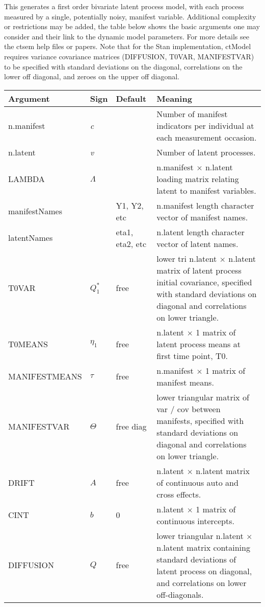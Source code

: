 \documentclass[nojss]{jss}\usepackage[]{graphicx}\usepackage[]{color}
\begin{document}
This generates a first order bivariate latent process model, with each process measured by a single, potentially noisy, manifest variable. Additional complexity or restrictions may be added, the table below shows the basic arguments one may consider and their link to the dynamic model parameters. For more details see the ctsem help files or papers. Note that for the Stan implementation, ctModel requires variance covariance matrices (DIFFUSION, T0VAR, MANIFESTVAR) to be specified with standard deviations on the diagonal, correlations on the lower off diagonal, and zeroes on the upper off diagonal. 

\begin{table}\footnotesize
\begin{tabular}{l|l|l p{8cm} }
\textbf{Argument} & \textbf{Sign} & \textbf{Default} & \textbf{Meaning}\\
\hline
 n.manifest & \textit{c} & & Number of manifest indicators per individual at each measurement occasion.\\
 n.latent & \textit{v} & & Number of latent processes.\\
 LAMBDA & $\Lambda$& & n.manifest $\times$ n.latent loading matrix relating latent to manifest variables.\\
 manifestNames & & Y1, Y2, etc & n.manifest length character vector of manifest names.\\
 latentNames & & eta1, eta2, etc & n.latent length character vector of latent names.\\
 T0VAR & $Q^*_1$ & free & lower tri n.latent $\times$ n.latent matrix of latent process initial covariance, specified with standard deviations on diagonal and correlations on lower triangle.\\
 T0MEANS & $\eta_1$ & free & n.latent $\times$ 1 matrix of latent process means at first time point, T0.\\
 MANIFESTMEANS & $\tau$ & free & n.manifest $\times$ 1 matrix of manifest means.\\
 MANIFESTVAR & $\Theta$ & free diag & lower triangular matrix of var / cov between manifests, specified with standard deviations on diagonal and correlations on lower triangle.\\
 DRIFT & $A$ & free & n.latent $\times$ n.latent matrix of continuous auto and cross effects.\\
 CINT & $b$ & 0 & n.latent $\times$ 1 matrix of continuous intercepts.\\
 DIFFUSION & $Q$ & free & lower triangular n.latent $\times$ n.latent matrix containing standard deviations of latent process on diagonal, and correlations on lower off-diagonals.\\

\end{tabular}
\end{table}
\end{document}
